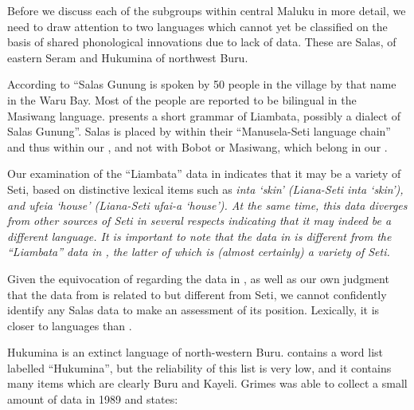 Before we discuss each of the subgroups within central
Maluku in more detail,
we need to draw attention to two languages which
cannot yet be classified on the basis of shared phonological
innovations due to lack of data.
These are Salas, of eastern Seram and Hukumina of northwest Buru.

According to \citet[121f]{LoskiLoski1989} “Salas Gunung is
spoken by 50 people in the village by that name in the Waru Bay.
Most of the people are reported to be bilingual in the Masiwang language.
\citet{Tauern1931} presents a short grammar of Liambata,
possibly a dialect of Salas Gunung”.
Salas is placed by \citet{LoskiLoski1989} within their “Manusela-Seti
language chain” and thus within our ,
and not with Bobot or Masiwang,
which belong in our .

Our examination of the ``Liambata'' data in \citet[128--139]{Tauern1931}
indicates that it may be a variety of Seti,
based on distinctive lexical items such as \it{inta} ‘skin’ (Liana-Seti
\it{inta} ‘skin’), and \it{ufeia} ‘house’ (Liana-Seti \it{ufai-a} ‘house’).
At the same time,
this data diverges from other sources of Seti in several respects
indicating that it may indeed be a different language.
It is important to note that the data in \citet[128--139]{Tauern1931}
is different from the “Liambata” data in \citet{Stresemann1927},
the latter of which \it{is} (almost certainly) a variety of Seti.

Given the equivocation of \citet{LoskiLoski1989} regarding the
data in \citet{Tauern1931}, as well as our own judgment that the data from \citet{Tauern1931}
is related to but different from Seti,
we cannot confidently identify any Salas data to make an assessment of its position.
Lexically, it is closer to  languages than .

Hukumina is an extinct language of north-western Buru.
\citet[63--76]{Stokhof1982b} contains a word list labelled ``Hukumina'',
but the reliability of this list is very low,
and it contains many items which are clearly Buru and Kayeli.
Grimes was able to collect a small amount of data in 1989
and states:

